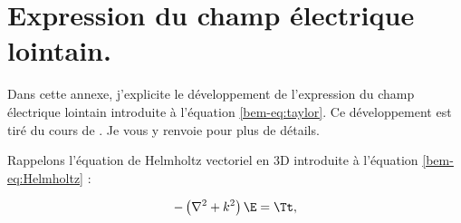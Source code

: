 \chapter{Expression du champ électrique lointain.}

Dans cette annexe, j'explicite le développement de l'expression du champ électrique lointain introduite à l'équation \eqref{bem-eq:taylor}. Ce développement est tiré du cours de \cite{Bendali2013}. Je vous y renvoie pour plus de détails.





Rappelons l'équation de Helmholtz vectoriel en 3D introduite à l'équation \eqref{bem-eq:Helmholtz} :

\begin{equation}
    -\left(\nabla^2+k^2\right)\E = \Tt,
    \label{app-eq:helm}
\end{equation}

